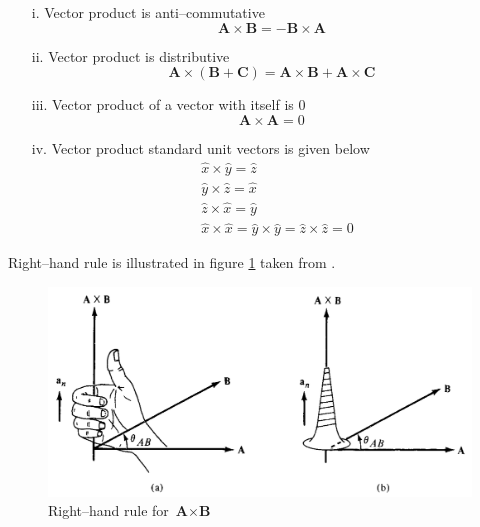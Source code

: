 \documentclass[12pt,a4paper]{article}
\begin{document}
\begin{itemize}
\item[i.] Vector product is anti--commutative
\begin{equation*}
\textbf{A}\times \textbf{B}=-\textbf{B}\times \textbf{A}
\end{equation*}
\item[ii.] Vector product is distributive
\begin{equation*}
\textbf{A}\times (\textbf{B}+\textbf{C})=\textbf{A}\times \textbf{B}+\textbf{A}\times \textbf{C}
\end{equation*}
\item[iii.] Vector product of a vector with itself is 0
\begin{equation*}
\textbf{A}\times \textbf{A}=0
\end{equation*}
\item[iv.] Vector product standard unit vectors is given below
\begin{equation*}
\begin{split}
&\hat x\times\hat y=\hat z\\
&\hat y\times\hat z=\hat x\\
&\hat z\times\hat x=\hat y\\
&\hat x\times\hat x=\hat y\times\hat y=\hat z\times\hat z=0
\end{split}
\end{equation*}
\end{itemize}
Right--hand rule is illustrated in figure \ref{Right-hand-rule} taken from \cite[Figure 1.8, page 14]{Sadiku}.
\begin{figure}[H]
\includegraphics[scale=0.45]{Figure1-8S.png}
\caption{Right--hand rule for $\textbf{A}\times \textbf{B}$ \cite[Figure 1.8, page 14]{Sadiku}}
\label{Right-hand-rule}
\end{figure}
\end{document}
